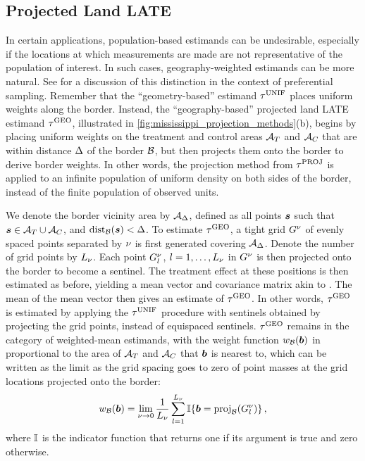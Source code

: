 \subsection{Projected Land LATE}
In certain applications, population-based estimands can be undesirable, especially if the locations at which measurements are made are not representative of the population of interest.
In such cases, geography-weighted estimands can be more natural.
See \cite{antonelli2016positive} for a discussion of this distinction in the context of preferential sampling.
Remember that the ``geometry-based'' estimand \(\tau^{\mathrm{UNIF}}\) places uniform weights along the border.
Instead, the ``geography-based'' projected land LATE estimand \(\tau^{\mathrm{GEO}}\), illustrated in \autoref{fig:mississippi_projection_methods}(b), begins by placing uniform weights on the treatment and control areas \(\mathcal{A}_T\) and \(\mathcal{A}_C\) that are within distance \(\Delta\) of the border \(\mathcal{B}\), but then projects them onto the border to derive border weights.
In other words, the projection method from \(\tau^{\mathrm{PROJ}}\) is applied to an infinite population of uniform density on both sides of the border, instead of the finite population of observed units.

	We denote the border vicinity area by \(\mathcal{A}_\Delta\), defined as all points \(\bm{s}\) such that \(\bm{s} \in {\mathcal{A}_T\cup \mathcal{A}_C}\), and \(\dist_{\border}\del{\svec} < \buffer\).
To estimate \(\tau^{\mathrm{GEO}}\), a tight grid \(G^\nu\) of evenly spaced points separated by \(\nu\) is first generated covering \(\mathcal{A}_\Delta\).
Denote the number of grid points by \(L_\nu\).
Each point \(G^\nu_l\), \(l=1,\dotsc,L_\nu\) in \(G^\nu\) is then projected onto the border to become a sentinel.
The treatment effect at these positions is then estimated as before, yielding a mean vector and covariance matrix akin to .
The mean of the mean vector then gives an estimate of \(\tau^{\mathrm{GEO}}\).
In other words, \(\tau^{\mathrm{GEO}}\) is estimated by applying the \(\tau^{\mathrm{UNIF}}\) procedure with sentinels obtained by projecting the grid points, instead of equispaced sentinels.
\(\tau^{\mathrm{GEO}}\) remains in the category of weighted-mean estimands, with the weight function \(w_{\mathcal{B}}(\bm{b})\) in  proportional to the area of \(\mathcal{A}{}_{T}\) and \(\mathcal{A}{}_{C}\) that \(\bm{b}\) is nearest to, which can be written as the limit as the grid spacing goes to zero of point masses at the grid locations projected onto the border:
\begin{equation}
    \weightb(\sentinel) = \lim_{\gridres \rightarrow 0}\frac{1}{L_\gridres}\sum_{l=1}^{L_\gridres} \Ind\cbr{\sentinel = \proj_{\border}\del{\grid_l} }\,,
\end{equation}
where \(\operatorname{\mathbb{I}}\) is the indicator function that returns one if its argument is true and zero otherwise.

